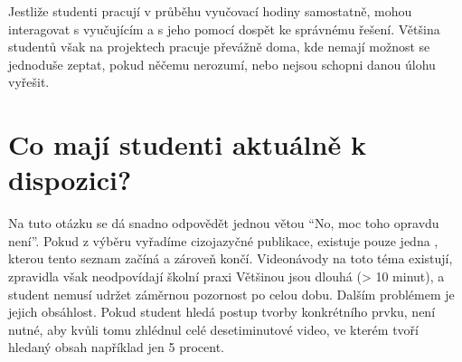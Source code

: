     Jestliže studenti pracují v průběhu vyučovací hodiny samostatně, mohou interagovat s vyučujícím a s jeho pomocí dospět ke správnému řešení.
    Většina studentů však na projektech pracuje převážně doma, kde nemají možnost se jednoduše zeptat, pokud něčemu nerozumí, nebo nejsou schopni danou úlohu vyřešit.

\section{Co mají studenti aktuálně k dispozici?}
    Na tuto otázku se dá snadno odpovědět jednou větou \enquote{No, moc toho opravdu není}.
    Pokud z výběru vyřadíme cizojazyčné publikace, existuje pouze jedna , kterou tento seznam začíná a zároveň končí. 
    Videonávody na toto téma existují, zpravidla však neodpovídají školní praxi
    Většinou jsou dlouhá (> 10 minut), a student nemusí udržet záměrnou pozornost po celou dobu.
    Dalším problémem je jejich obsáhlost.
    Pokud student hledá postup tvorby konkrétního prvku, není nutné, aby kvůli tomu zhlédnul celé desetiminutové video, ve kterém tvoří hledaný obsah například jen 5 procent. 
